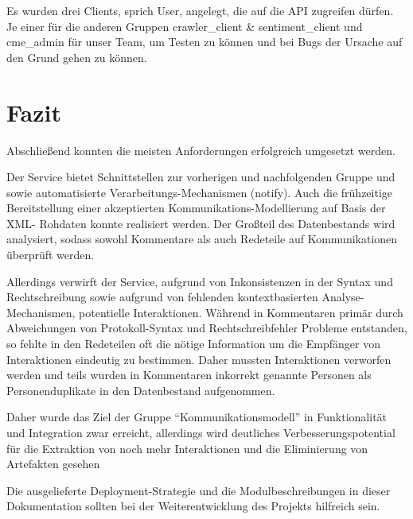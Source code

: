 Es wurden drei Clients, sprich User, angelegt, die auf die API zugreifen
dürfen. Je einer für die anderen Gruppen crawler\_client \& sentiment\_client und
cme\_admin für unser Team, um Testen zu können und bei Bugs der Ursache auf den
Grund gehen zu können.

\section{Fazit}\label{sec:03_05_fazit}

Abschließend konnten die meisten Anforderungen erfolgreich umgesetzt werden.

Der Service bietet Schnittstellen zur vorherigen und nachfolgenden Gruppe und
sowie automatisierte Verarbeitungs-Mechanismen (notify). Auch die frühzeitige
Bereitstellung einer akzeptierten Kommunikations-Modellierung auf Basis der XML-
Rohdaten konnte realisiert werden. Der Großteil des Datenbestands wird
analysiert, sodass sowohl Kommentare als auch Redeteile auf Kommunikationen
überprüft werden.

Allerdings verwirft der Service, aufgrund von Inkonsistenzen in der Syntax und
Rechtschreibung sowie aufgrund von fehlenden kontextbasierten Analyse-
Mechanismen, potentielle Interaktionen. Während in Kommentaren primär durch
Abweichungen von Protokoll-Syntax und Rechtschreibfehler Probleme entstanden,
so fehlte in den Redeteilen oft die nötige Information um die Empfänger von
Interaktionen eindeutig zu bestimmen. Daher mussten Interaktionen verworfen
werden und teils wurden in Kommentaren inkorrekt genannte Personen als
Personenduplikate in den Datenbestand aufgenommen.

Daher wurde das Ziel der Gruppe “Kommunikationsmodell” in Funktionalität und
Integration zwar erreicht, allerdings wird deutliches Verbesserungspotential
für die Extraktion von noch mehr Interaktionen und die Eliminierung von
Artefakten gesehen

Die ausgelieferte Deployment-Strategie und die Modulbeschreibungen in dieser
Dokumentation sollten bei der Weiterentwicklung des Projekts hilfreich sein.
